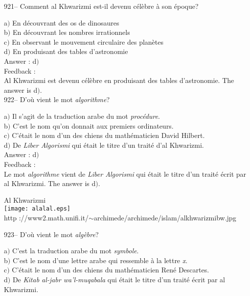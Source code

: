 ﻿\documentclass[letterpaper, 12pt]{article}
\begin{document}
921-- Comment al Khwarizmi est-il devenu c\'el\`ebre \`a son
\'epoque?

a$)$ En d\'ecouvrant des os de dinosaures \\
b$)$ En d\'ecouvrant les nombres irrationnels \\
c$)$ En observant le mouvement circulaire des plan\`etes \\
d$)$ En produisant des tables d'astronomie \\

Answer : d$)$\\

Feedback : \\
Al Khwarizmi est devenu c\'el\`ebre en produisant des tables d'astronomie.
The answer is d$)$.\\

922-- D'o\`u vient le mot {\sl algorithme}?

a$)$ Il s'agit de la traduction arabe du mot {\sl proc\'edure}. \\
b$)$ C'est le nom qu'on donnait aux premiers ordinateurs. \\
c$)$ C'\'etait le nom d'un des chiens du math\'ematicien David Hilbert. \\
d$)$ De {\sl Liber Algorismi} qui \'etait le titre d'un trait\'e d'al
Khwarizmi. \\

Answer : d$)$\\

Feedback :\\
Le mot {\sl algorithme} vient de {\sl Liber Algorismi} qui \'etait le titre
d'un trait\'e \'ecrit par al Khwarizmi. The answer is d$)$.\\

        \begin{center}
        Al Khwarizmi\\
    \texttt{[image: alalal.eps]}\\
        {\footnotesize http
://www2.math.unifi.it/$\sim$archimede/archimede/islam/alkhwarizmibw.jpg}
    \end{center}

923-- D'o\`u vient le mot {\sl alg\`ebre}?

a$)$ C'est la traduction arabe du mot {\sl symbole}. \\
b$)$ C'est le nom d'une lettre arabe qui ressemble \`a la lettre {\sl x}. \\
c$)$ C'\'etait le nom d'un des chiens du math\'ematicien Ren\'e Descartes.
\\
d$)$ De {\sl Kitab al-jabr wa'l-muqabala} qui \'etait le titre d'un trait\'e
\'ecrit par al Khwarizmi. \\
\end{document}
